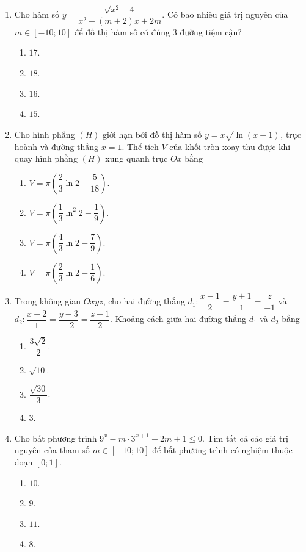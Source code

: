 \documentclass[12pt,a4paper]{article}
\begin{document}
\begin{enumerate}[label=\textbf{Câu \arabic*:}, leftmargin=*]
\item Cho hàm số $y = \dfrac{\sqrt{x^2 - 4}}{x^2 - (m+2)x + 2m}$. Có bao nhiêu giá trị nguyên của $m \in [-10; 10]$ để đồ thị hàm số có đúng $3$ đường tiệm cận?
\begin{enumerate}[label=\Alph*.]
    \item $17$.
    \item $18$.
    \item $16$.
    \item $15$.
\end{enumerate}

\item Cho hình phẳng $(H)$ giới hạn bởi đồ thị hàm số $y = x \sqrt{\ln(x + 1)}$, trục hoành và đường thẳng $x = 1$. Thể tích $V$ của khối tròn xoay thu được khi quay hình phẳng $(H)$ xung quanh trục $Ox$ bằng
\begin{enumerate}[label=\Alph*.]
    \item $V = \pi \left( \dfrac{2}{3} \ln 2 - \dfrac{5}{18} \right)$.
    \item $V = \pi \left( \dfrac{1}{3} \ln^2 2 - \dfrac{1}{9} \right)$.
    \item $V = \pi \left( \dfrac{4}{3} \ln 2 - \dfrac{7}{9} \right)$.
    \item $V = \pi \left( \dfrac{2}{3} \ln 2 - \dfrac{1}{6} \right)$.
\end{enumerate}

\item Trong không gian $Oxyz$, cho hai đường thẳng $d_1: \dfrac{x-1}{2} = \dfrac{y+1}{1} = \dfrac{z}{-1}$ và $d_2: \dfrac{x-2}{1} = \dfrac{y-3}{-2} = \dfrac{z+1}{2}$. Khoảng cách giữa hai đường thẳng $d_1$ và $d_2$ bằng
\begin{enumerate}[label=\Alph*.]
    \item $\dfrac{3\sqrt{2}}{2}$.
    \item $\sqrt{10}$.
    \item $\dfrac{\sqrt{30}}{3}$.
    \item $3$.
\end{enumerate}

\item Cho bất phương trình $9^x - m \cdot 3^{x+1} + 2m + 1 \le 0$. Tìm tất cả các giá trị nguyên của tham số $m \in [-10; 10]$ để bất phương trình có nghiệm thuộc đoạn $[0; 1]$.
\begin{enumerate}[label=\Alph*.]
    \item $10$.
    \item $9$.
    \item $11$.
    \item $8$.
\end{enumerate}


\end{enumerate}
\end{document}
